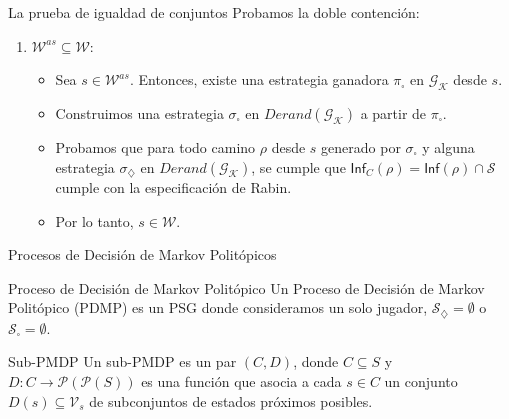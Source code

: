 \documentclass{beamer}
\newcommand{\St}{\mathcal{S}}
\newcommand{\diam}{\diamondsuit}
\newcommand{\cuad}{\square}
\newcommand{\Gk}{\mathcal{G}_\mathcal{K}}
\newcommand{\Vs}{\mathcal{V}_s}
\newcommand{\Inf}{\textsf{Inf}}
\newcounter{saveenumi}
\newcommand{\conti}{\setcounter{enumi}{\value{saveenumi}}}
\newcommand{\W}{\mathcal{W}}
\newcommand{\DGk}{Derand(\Gk)}
\begin{document}
\begin{frame}{La prueba de igualdad de conjuntos}
	Probamos la doble contenci\'on:
	\begin{enumerate}
		\conti
		\item $\W^{as} \subseteq \W$:
		      \pause

		      \begin{itemize}
			      \item Sea $s \in \W^{as}$. Entonces, existe una estrategia ganadora $\pi_\cuad$ en
			            $\Gk$ desde $s$. \pause
			      \item Construimos una estrategia $\sigma_\cuad$ en $\DGk$ a partir de $\pi_\cuad$.
			            \pause
			      \item Probamos que para todo camino $\rho$ desde $s$ generado por $\sigma_\cuad$ y
			            alguna estrategia $\sigma_\diam$ en $\DGk$, se cumple que $\Inf_C(\rho) =
				            \Inf(\rho) \cap \St$ cumple con la especificaci\'on de Rabin. \pause
			      \item Por lo tanto, $s \in \W$.
		      \end{itemize}
	\end{enumerate}
\end{frame}

\begin{frame}{Procesos de Decisi\'on de Markov Polit\'opicos}
	\begin{block}{Proceso de Decisión de Markov Politópico}
		Un Proceso de Decisión de Markov Politópico (PDMP) es un PSG donde consideramos un solo jugador, $\St_\diam = \emptyset$ o
		$\St_\cuad = \emptyset$.
	\end{block}

	\pause
	\begin{block}{Sub-PMDP}
		Un sub-PMDP es un par $(C, D)$, donde $C \subseteq S$ y $D: C \rightarrow \mathcal{P}(\mathcal{P}(S))$ es una función que asocia a cada $s \in C$ un conjunto $D(s) \subseteq \Vs$ de subconjuntos de estados próximos posibles.
	\end{block}

\end{frame}
\end{document}
